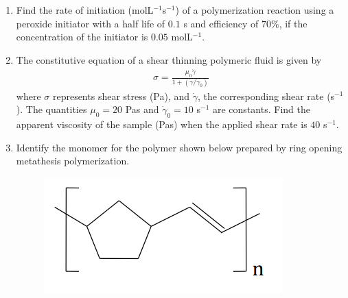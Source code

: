 \documentclass[a4paper,10pt]{article}
\begin{document}
\begin{enumerate}
    \item Find the rate of initiation (molL$^{-1}$s$^{-1}$) of a polymerization reaction using a peroxide initiator with a half life of $0.1$ s and efficiency of $70\%$, if the concentration of the initiator is $0.05$ molL$^{-1}$.
    
    \hfill{}
    
    \item The constitutive equation of a shear thinning polymeric fluid is given by
    \begin{align*}
        \sigma = \frac{\mu_0 \dot{\gamma}}{1 + (\dot{\gamma}/\dot{\gamma}_0)}
    \end{align*}
    where $\sigma$ represents shear stress (Pa), and $\dot{\gamma}$, the corresponding shear rate (s$^{-1}$). The quantities $\mu_0 = 20$ Pas and $\dot{\gamma}_0 = 10$ s$^{-1}$ are constants. Find the apparent viscosity of the sample (Pas) when the applied shear rate is $40$ s$^{-1}$.
    
    \hfill{}
    
    \item Identify the monomer for the polymer shown below prepared by ring opening metathesis polymerization.
    \begin{figure}[H] \centering \includegraphics[width=0.4\columnwidth]{q13_poly.png} \caption*{} \label{fig:q13_poly} \end{figure}
    

\end{enumerate}
\end{document}
